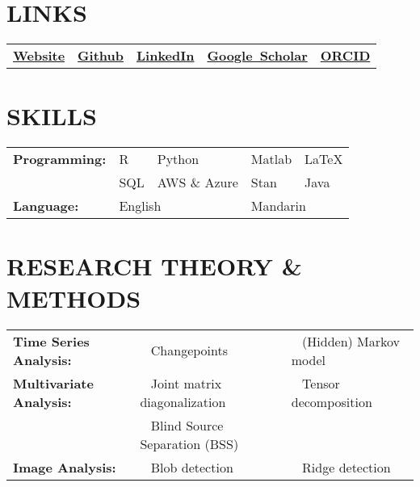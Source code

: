\documentclass[pdftex,11pt]{article}	%
\newif\ifacademia
\begin{document}
\printbibliography[heading=none, resetnumbers=true, keyword=present]

\section*{LINKS}
\begin{tabularx}{\textwidth}{@{} X  X  X  X  X @{}}
	 \mbox{\href{https://xycyuchenxu.github.io/YuchenXu/}{\bf{Website}}}  & \mbox{\href{https://github.com/XycYuchenXu}{\bf Github}} &
	\mbox{\href{https://www.linkedin.com/in/yuchenxu1015/}{\bf LinkedIn}} & \mbox{\href{https://scholar.google.com/citations?hl=en\&authuser=1\&user=Tx9EcgMAAAAJ}{\bf{Google Scholar}}} &
	\mbox{\href{https://orcid.org/0000-0003-1128-3774}{\bf{ORCID}}}
\end{tabularx}

\section*{SKILLS}
\begin{tabularx}{\textwidth}{@{} X X X X X @{}}
	{\bf Programming:} & R & Python & Matlab & \LaTeX \\
	& SQL & AWS \& Azure & Stan & Java\\
	{\bf Language:} & \multicolumn{2}{l}{English} & \multicolumn{2}{l}{Mandarin}
\end{tabularx}

\ifacademia
\else
\section*{RESEARCH THEORY \& METHODS}

\begin{tabularx}{\textwidth}{@{} p{4cm} X X @{}}
	{\bf Time Series Analysis:} & \textbullet ~ Changepoints & \textbullet ~ (Hidden) Markov model \\
	{\bf Multivariate Analysis:} & \textbullet ~ Joint matrix diagonalization & \textbullet ~ Tensor decomposition \\
	& \textbullet ~ Blind Source Separation (BSS) & \\
	{\bf Image Analysis:} & \textbullet ~ Blob detection & \textbullet ~ Ridge detection
\end{tabularx}
\end{document}
